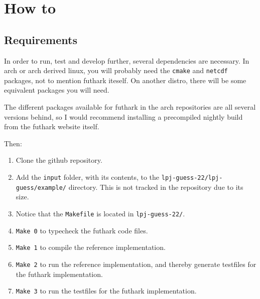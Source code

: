 \section{How to}
\subsection{Requirements}
In order to run, test and develop further, several dependencies are necessary. In arch or arch derived linux, you will probably need the \texttt{cmake} and \texttt{netcdf} packages, not to mention futhark iteself. On another distro, there will be some equivalent packages you will need.

The different packages available for futhark in the arch repositories are all several versions behind, so I would recommend installing a precompiled nightly build from the futhark website itself.

Then:
\begin{enumerate}
\item Clone the github repository.
\item Add the \texttt{input} folder, with its contents, to the \texttt{lpj-guess-22/lpj-guess/example/} directory. This is not tracked in the repository due to its size.
\item Notice that the \texttt{Makefile} is located in \texttt{lpj-guess-22/}.
\item \texttt{Make 0} to typecheck the futhark code files.
\item \texttt{Make 1} to compile the reference implementation.
\item \texttt{Make 2} to run the reference implementation, and thereby generate testfiles for the futhark implementation.
\item \texttt{Make 3} to run the testfiles for the futhark implementation.
\end{enumerate}
